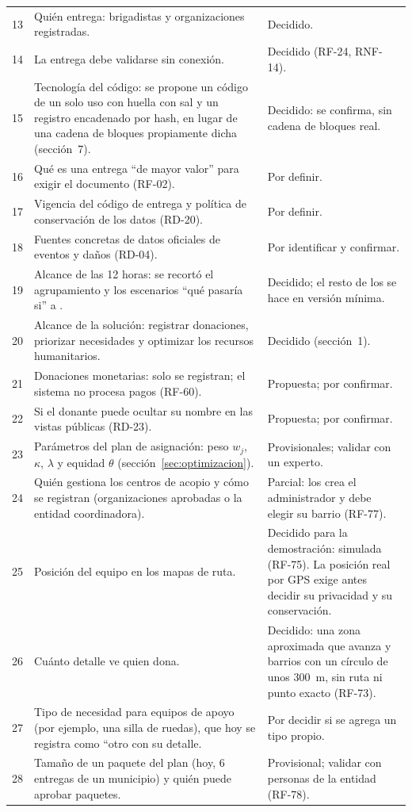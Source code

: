 \begin{longtable}{@{}p{0.9cm}p{8cm}p{4.2cm}@{}}
13 & Quién entrega: brigadistas y organizaciones registradas. & Decidido. \\
14 & La entrega debe validarse sin conexión. & Decidido (RF-24, RNF-14). \\
15 & Tecnología del código: se propone un código de un solo uso con huella con sal y un registro encadenado por hash, en lugar de una cadena de bloques propiamente dicha (sección~7). & Decidido: se confirma, sin cadena de bloques real. \\
16 & Qué es una entrega ``de mayor valor'' para exigir el documento (RF-02). & Por definir. \\
17 & Vigencia del código de entrega y política de conservación de los datos (RD-20). & Por definir. \\
18 & Fuentes concretas de datos oficiales de eventos y daños (RD-04). & Por identificar y confirmar. \\
19 & Alcance de las 12 horas: se recortó el agrupamiento y los escenarios ``qué pasaría si'' a \Could{}. & Decidido; el resto de los \Must{} se hace en versión mínima. \\
20 & Alcance de la solución: registrar donaciones, priorizar necesidades y optimizar los recursos humanitarios. & Decidido (sección~1). \\
21 & Donaciones monetarias: solo se registran; el sistema no procesa pagos (RF-60). & Propuesta; por confirmar. \\
22 & Si el donante puede ocultar su nombre en las vistas públicas (RD-23). & Propuesta; por confirmar. \\
23 & Parámetros del plan de asignación: peso $w_j$, $\kappa$, $\lambda$ y equidad $\theta$ (sección~\ref{sec:optimizacion}). & Provisionales; validar con un experto. \\
24 & Quién gestiona los centros de acopio y cómo se registran (organizaciones aprobadas o la entidad coordinadora). & Parcial: los crea el administrador y debe elegir su barrio (RF-77). \\
25 & Posición del equipo en los mapas de ruta. & Decidido para la demostración: simulada (RF-75). La posición real por GPS exige antes decidir su privacidad y su conservación. \\
26 & Cuánto detalle ve quien dona. & Decidido: una zona aproximada que avanza y barrios con un círculo de unos 300~m, sin ruta ni punto exacto (RF-73). \\
27 & Tipo de necesidad para equipos de apoyo (por ejemplo, una silla de ruedas), que hoy se registra como ``otro con su detalle. & Por decidir si se agrega un tipo propio. \\
28 & Tamaño de un paquete del plan (hoy, 6 entregas de un municipio) y quién puede aprobar paquetes. & Provisional; validar con personas de la entidad (RF-78). \\
\bottomrule
\end{longtable}
\addtocounter{table}{-1}
